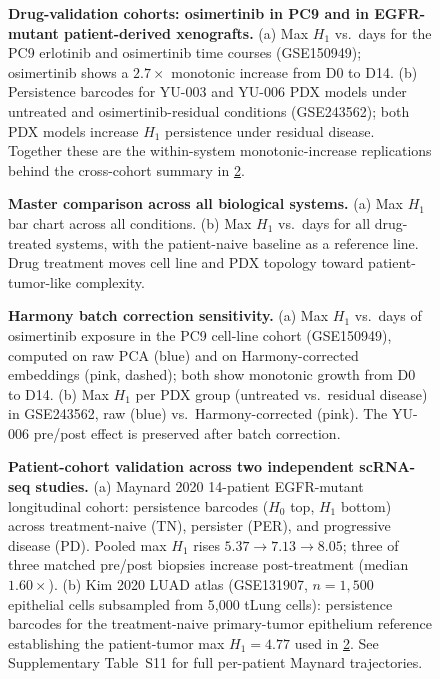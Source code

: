 \begin{figure}
  \caption{\textbf{Drug-validation cohorts: osimertinib in PC9 and in
  EGFR-mutant patient-derived xenografts.}
  (a) Max $H_1$ vs.\ days for the PC9 erlotinib and osimertinib time
  courses (GSE150949); osimertinib shows a $2.7\times$ monotonic
  increase from D0 to D14.
  (b) Persistence barcodes for YU-003 and YU-006 PDX models under
  untreated and osimertinib-residual conditions (GSE243562); both
  PDX models increase $H_1$ persistence under residual disease.
  Together these are the within-system monotonic-increase
  replications behind the cross-cohort summary in \cref{fig:master}.}
  \label{fig:validation}
\end{figure}

\begin{figure}
  \caption{\textbf{Master comparison across all biological systems.}
  (a) Max $H_1$ bar chart across all conditions.
  (b) Max $H_1$ vs.\ days for all drug-treated systems, with the
  patient-naive baseline as a reference line. Drug treatment moves
  cell line and PDX topology toward patient-tumor-like complexity.}
  \label{fig:master}
\end{figure}

\begin{figure}
  \caption{\textbf{Harmony batch correction sensitivity.}
  (a) Max $H_1$ vs.\ days of osimertinib exposure in the PC9 cell-line
  cohort (GSE150949), computed on raw PCA (blue) and on
  Harmony-corrected embeddings (pink, dashed); both show monotonic
  growth from D0 to D14.
  (b) Max $H_1$ per PDX group (untreated vs.\ residual disease) in
  GSE243562, raw (blue) vs.\ Harmony-corrected (pink). The YU-006
  pre/post effect is preserved after batch correction.}
  \label{fig:harmony}
\end{figure}

\begin{figure}
  \caption{\textbf{Patient-cohort validation across two independent
  scRNA-seq studies.}
  (a) Maynard 2020 14-patient EGFR-mutant longitudinal cohort:
  persistence barcodes ($H_0$ top, $H_1$ bottom) across
  treatment-naive (TN), persister (PER), and progressive disease
  (PD). Pooled max $H_1$ rises $5.37 \to 7.13 \to 8.05$; three of
  three matched pre/post biopsies increase post-treatment (median
  $1.60\times$).
  (b) Kim 2020 LUAD atlas (GSE131907, $n = 1{,}500$ epithelial cells
  subsampled from 5{,}000 tLung cells): persistence barcodes for the
  treatment-naive primary-tumor epithelium reference establishing the
  patient-tumor max $H_1 = 4.77$ used in \cref{fig:master}. See
  Supplementary Table~S11 for full per-patient Maynard
  trajectories.}
  \label{fig:patient}
\end{figure}

